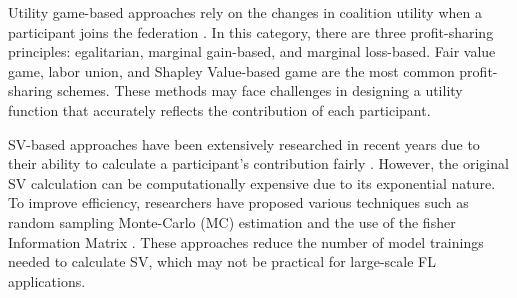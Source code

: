 \documentclass{article}
\begin{document}
Utility game-based approaches rely on the changes in coalition utility when a participant joins the federation \cite{wang2019measure,ghorbani2019data,nishio2020estimation}. In this category, there are three profit-sharing principles: egalitarian, marginal gain-based, and marginal loss-based. Fair value game, labor union, and Shapley Value-based game are the most common profit-sharing schemes. These methods may face challenges in designing a utility function that accurately reflects the contribution of each participant.

SV-based approaches have been extensively researched in recent years due to their ability to calculate a participant's contribution fairly \cite{shapley1953value}. However, the original SV calculation can be computationally expensive due to its exponential nature. To improve efficiency, researchers have proposed various techniques such as random sampling Monte-Carlo (MC) estimation \cite{castro2009polynomial} and the use of the fisher Information Matrix \cite{tang2021incentive}. These approaches reduce the number of model trainings needed to calculate SV, which may not be practical for large-scale FL applications.


\end{document}
